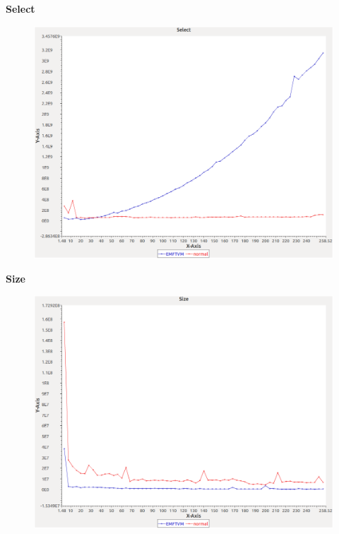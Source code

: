\noindent\textbf{Select}

\begin{figure}[h]
\centering
\includegraphics[width=\textwidth]{graphs/bag/Select}
\end{figure}
\pagebreak

\noindent\textbf{Size}

\begin{figure}[h]
\centering
\includegraphics[width=\textwidth]{graphs/bag/Size}
\end{figure}
\pagebreak

